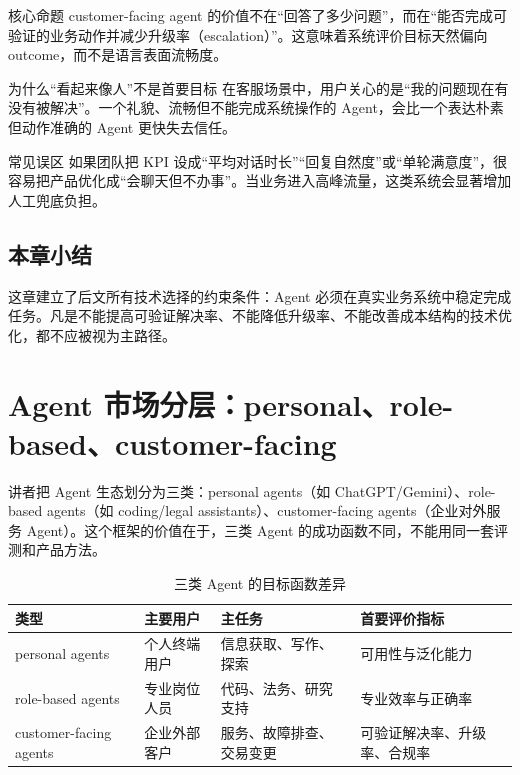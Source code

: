 \documentclass[a4paper]{article}
\begin{document}
\begin{importantbox}{核心命题}
customer-facing agent 的价值不在“回答了多少问题”，而在“能否完成可验证的业务动作并减少升级率（escalation）”。这意味着系统评价目标天然偏向 outcome，而不是语言表面流畅度。
\end{importantbox}

\begin{knowledgebox}{为什么“看起来像人”不是首要目标}
在客服场景中，用户关心的是“我的问题现在有没有被解决”。一个礼貌、流畅但不能完成系统操作的 Agent，会比一个表达朴素但动作准确的 Agent 更快失去信任。
\end{knowledgebox}

\begin{warningbox}{常见误区}
如果团队把 KPI 设成“平均对话时长”“回复自然度”或“单轮满意度”，很容易把产品优化成“会聊天但不办事”。当业务进入高峰流量，这类系统会显著增加人工兜底负担。
\end{warningbox}

\subsection{本章小结}

这章建立了后文所有技术选择的约束条件：Agent 必须在真实业务系统中稳定完成任务。凡是不能提高可验证解决率、不能降低升级率、不能改善成本结构的技术优化，都不应被视为主路径。

\section{Agent 市场分层：personal、role-based、customer-facing}

讲者把 Agent 生态划分为三类：personal agents（如 ChatGPT/Gemini）、role-based agents（如 coding/legal assistants）、customer-facing agents（企业对外服务 Agent）。这个框架的价值在于，三类 Agent 的成功函数不同，不能用同一套评测和产品方法。

\begin{table}[H]
\centering
\caption{三类 Agent 的目标函数差异}
\begin{tabularx}{\textwidth}{>{\raggedright\arraybackslash}p{2.8cm} >{\raggedright\arraybackslash}p{3.2cm} >{\raggedright\arraybackslash}X >{\raggedright\arraybackslash}p{3.2cm}}
\toprule
类型 & 主要用户 & 主任务 & 首要评价指标 \\
\midrule
personal agents & 个人终端用户 & 信息获取、写作、探索 & 可用性与泛化能力 \\
role-based agents & 专业岗位人员 & 代码、法务、研究支持 & 专业效率与正确率 \\
customer-facing agents & 企业外部客户 & 服务、故障排查、交易变更 & 可验证解决率、升级率、合规率 \\
\bottomrule
\end{tabularx}
\end{table}
\end{document}
